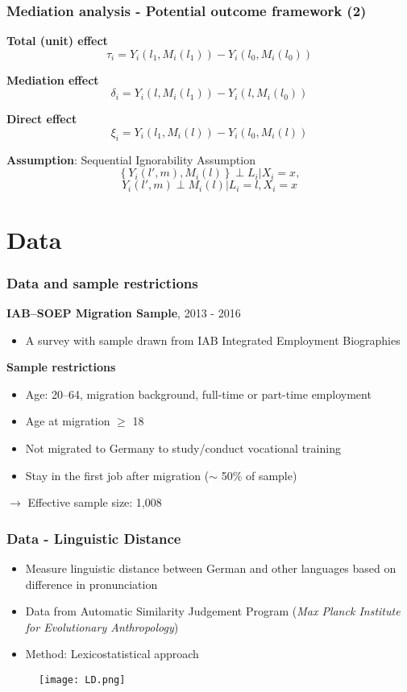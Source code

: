 \documentclass{beamer}
\begin{document}

\begin{frame} %
\frametitle{Mediation analysis - Potential outcome framework (2)}
\textbf{Total (unit) effect}
$$\tau_{i} = Y_{i}(l_{1}, M_{i}(l_{1})) - Y_{i}(l_{0}, M_{i}(l_{0}))$$

\textbf{Mediation effect}
$$\delta_{i} = Y_{i}(l, M_{i}(l_{1})) - Y_{i}(l, M_{i}(l_{0}))$$

\textbf{Direct effect}
$$\xi_{i} = Y_{i}(l_{1}, M_{i}(l)) - Y_{i}(l_{0}, M_{i}(l))$$

\textbf{Assumption}: Sequential Ignorability Assumption
$$\left \{Y_{i}(l', m), M_{i}(l)\right \} \perp L_{i}|X_{i}=x, $$
$$Y_{i}(l', m) \perp M_{i}(l)|L_{i}=l, X_{i}=x $$

\end{frame}


\section{Data}

\begin{frame}
\frametitle{Data and sample restrictions}
\textbf{IAB--SOEP Migration Sample}, 2013 - 2016
\begin{itemize}
\item A survey with sample drawn from IAB Integrated Employment Biographies
\end{itemize}
\textbf{Sample restrictions}
\begin{itemize}
\item Age: 20--64, migration background, full-time or part-time employment
\item Age at migration $\geq$ 18
\item Not migrated to Germany to study/conduct vocational training
\item Stay in the first job after migration ($\sim$ 50\% of sample)
\end{itemize}
$\rightarrow$ Effective sample size: 1,008

\end{frame}


\begin{frame}
\frametitle{Data - Linguistic Distance}
\begin{itemize}
\item Measure linguistic distance between German and other languages based on difference in pronunciation
\item Data from Automatic Similarity Judgement Program (\textit{Max Planck Institute for Evolutionary Anthropology})
\item Method: Lexicostatistical approach
\end{itemize}

\begin{figure}
\centering
\texttt{[image: LD.png]}
\end{figure}
\end{frame}
\end{document}
